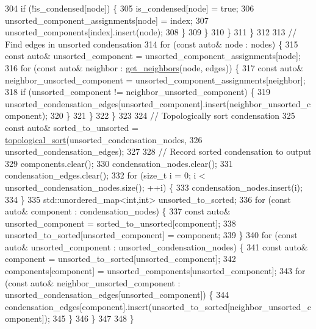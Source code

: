 \begin{DoxyCode}
304         \textcolor{keywordflow}{if} (!is\_condensed[node]) \{
305           is\_condensed[node] = \textcolor{keyword}{true};
306           unsorted\_component\_assignments[node] = index;
307           unsorted\_components[index].insert(node);
308         \}
309       \}
310     \}
311   \}
312 
313   \textcolor{comment}{// Find edges in unsorted condensation}
314   \textcolor{keywordflow}{for} (\textcolor{keyword}{const} \textcolor{keyword}{auto}& node : nodes) \{
315     \textcolor{keyword}{const} \textcolor{keyword}{auto}& unsorted\_component = unsorted\_component\_assignments[node];
316     \textcolor{keywordflow}{for} (\textcolor{keyword}{const} \textcolor{keyword}{auto}& neighbor : \hyperlink{namespacelbann_1_1graph_ad305e0d104d25d9cb1e63a4b93c0847c}{get\_neighbors}(node, edges)) \{
317       \textcolor{keyword}{const} \textcolor{keyword}{auto}& neighbor\_unsorted\_component = unsorted\_component\_assignments[neighbor];
318       \textcolor{keywordflow}{if} (unsorted\_component != neighbor\_unsorted\_component) \{
319         unsorted\_condensation\_edges[unsorted\_component].insert(neighbor\_unsorted\_component);
320       \}
321     \}
322   \}
323 
324   \textcolor{comment}{// Topologically sort condensation}
325   \textcolor{keyword}{const} \textcolor{keyword}{auto}& sorted\_to\_unsorted = \hyperlink{namespacelbann_1_1graph_aeb19a22d8fac402df104ed8d547a10ee}{topological\_sort}(unsorted\_condensation\_nodes,
326                                                     unsorted\_condensation\_edges);
327 
328   \textcolor{comment}{// Record sorted condensation to output}
329   components.clear();
330   condensation\_nodes.clear();
331   condensation\_edges.clear();
332   \textcolor{keywordflow}{for} (\textcolor{keywordtype}{size\_t} i = 0; i < unsorted\_condensation\_nodes.size(); ++i) \{
333     condensation\_nodes.insert(i);
334   \}
335   std::unordered\_map<int,int> unsorted\_to\_sorted;
336   \textcolor{keywordflow}{for} (\textcolor{keyword}{const} \textcolor{keyword}{auto}& component : condensation\_nodes) \{
337     \textcolor{keyword}{const} \textcolor{keyword}{auto}& unsorted\_component = sorted\_to\_unsorted[component];
338     unsorted\_to\_sorted[unsorted\_component] = component;
339   \}
340   \textcolor{keywordflow}{for} (\textcolor{keyword}{const} \textcolor{keyword}{auto}& unsorted\_component : unsorted\_condensation\_nodes) \{
341     \textcolor{keyword}{const} \textcolor{keyword}{auto}& component = unsorted\_to\_sorted[unsorted\_component];
342     components[component] = unsorted\_components[unsorted\_component];
343     \textcolor{keywordflow}{for} (\textcolor{keyword}{const} \textcolor{keyword}{auto}& neighbor\_unsorted\_component : unsorted\_condensation\_edges[unsorted\_component]) \{
344       condensation\_edges[component].insert(unsorted\_to\_sorted[neighbor\_unsorted\_component]);
345     \}
346   \}
347 
348 \}
\end{DoxyCode}
